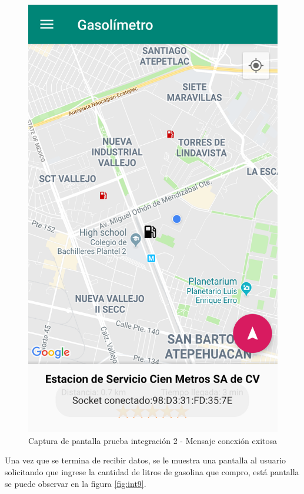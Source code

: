 \begin{figure}[H]
	\centering
	\includegraphics[scale=.2]{Capitulo6/integracion/software/images/8}
	\caption{Captura de pantalla prueba integración 2 - Mensaje conexión exitosa}
	\label{fig:int8}
\end{figure}

Una vez que se termina de recibir datos, se le muestra una pantalla al usuario solicitando que ingrese la cantidad de litros de gasolina que compro, está pantalla se puede observar en la figura \ref{fig:int9}.

